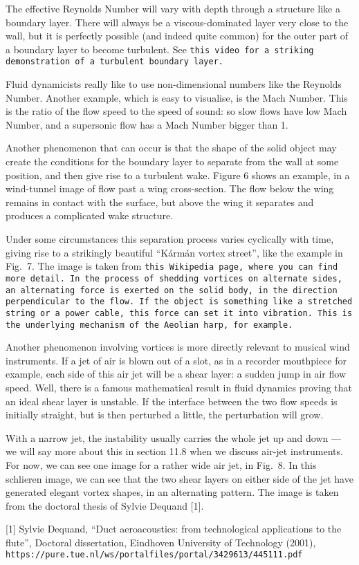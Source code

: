   The effective Reynolds Number will vary with depth through a structure like a 
  boundary layer. There will always be a viscous-dominated layer very close to 
  the wall, but it is perfectly possible (and indeed quite common) for the 
  outer part of a boundary layer to become turbulent. See \tt{}this video\rm{} 
  for a striking demonstration of a turbulent boundary layer. 

  Fluid dynamicists really like to use non-dimensional numbers like the 
  Reynolds Number. Another example, which is easy to visualise, is the Mach 
  Number. This is the ratio of the flow speed to the speed of sound: so slow 
  flows have low Mach Number, and a supersonic flow has a Mach Number bigger 
  than 1. 


  Another phenomenon that can occur is that the shape of the solid object may 
  create the conditions for the boundary layer to separate from the wall at 
  some position, and then give rise to a turbulent wake. Figure 6 shows an 
  example, in a wind-tunnel image of flow past a wing cross-section. The flow 
  below the wing remains in contact with the surface, but above the wing it 
  separates and produces a complicated wake structure. 

  Under some circumstances this separation process varies cyclically with time, 
  giving rise to a strikingly beautiful ``Kármán vortex street'', like the 
  example in Fig.\ 7. The image is taken from \tt{}this Wikipedia page\rm{}, 
  where you can find more detail. In the process of shedding vortices on 
  alternate sides, an alternating force is exerted on the solid body, in the 
  direction perpendicular to the flow. If the object is something like a 
  stretched string or a power cable, this force can set it into vibration. This 
  is the underlying mechanism of the Aeolian harp, for example. 

  Another phenomenon involving vortices is more directly relevant to musical 
  wind instruments. If a jet of air is blown out of a slot, as in a recorder 
  mouthpiece for example, each side of this air jet will be a shear layer: a 
  sudden jump in air flow speed. Well, there is a famous mathematical result in 
  fluid dynamics proving that an ideal shear layer is unstable. If the 
  interface between the two flow speeds is initially straight, but is then 
  perturbed a little, the perturbation will grow. 

  With a narrow jet, the instability usually carries the whole jet up and down 
  --- we will say more about this in section 11.8 when we discuss air-jet 
  instruments. For now, we can see one image for a rather wide air jet, in 
  Fig.\ 8. In this schlieren image, we can see that the two shear layers on 
  either side of the jet have generated elegant vortex shapes, in an 
  alternating pattern. The image is taken from the doctoral thesis of Sylvie 
  Dequand [1]. 



  \sectionreferences{}[1] Sylvie Dequand, “Duct aeroacoustics: from 
  technological applications to the flute”, Doctoral dissertation, Eindhoven 
  University of Technology (2001), \tt{}https://pure.tue.nl/ws/portalfiles/portal/3429613/445111.pdf\rm{} 